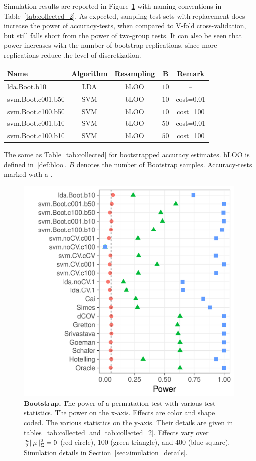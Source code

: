 \documentclass[]{bio}
\begin{document}
Simulation results are reported in Figure~\ref{fig:bootstrap} with naming conventions in Table~\ref{tab:collected_2}.
As expected, sampling test sets with replacement does increase the power of accuracy-tests, when compared to V-fold cross-validation, but still falls short from the power of two-group tests. 
It can also be seen that power increases with the number of bootstrap replications, since more replications reduce the level of discretization.

\bigskip

\begin{tcolorbox}
	\centering
	\footnotesize
	\begin{tabular}{l|c|c|c|c}
		Name & Algorithm & Resampling & B  & Remark\\ 
		\hline
		\hline
		\cue lda.Boot.b10 & LDA & bLOO 	& $10$ &  -- \\ 
		\cue svm.Boot.c001.b50 & SVM & bLOO 	& $10$ & cost=0.01 \\ 
		\cue svm.Boot.c100.b50 & SVM & bLOO 	& $10$ & cost=100 \\ 
		\cue svm.Boot.c001.b10 & SVM & bLOO 	& $50$ & cost=0.01 \\ 
		\cue svm.Boot.c100.b10 & SVM & bLOO 	& $50$ & cost=100 \\ 
	\end{tabular} 
	\captionsetup{type=table}
	\caption{\footnotesize
		The same as Table~\ref{tab:collected} for bootstrapped accuracy estimates. 
		bLOO is defined in~\ref{def:bloo}.
		$B$ denotes the number of Bootstrap samples.
		Accuracy-tests marked with a \cue.} 
	\label{tab:collected_2}
\end{tcolorbox}


\begin{figure}[ht]
	\centering
	\includegraphics[width=0.5\columnwidth]{"art/file13"}
	\caption{
		\textbf{Bootstrap.}
		The power of a permutation test with various test statistics. 
		The power on the x-axis. 
		Effects are color and shape coded. 
		The various statistics on the y-axis. 
		Their details are given in tables~\ref{tab:collected} and \ref{tab:collected_2}. 
		Effects vary over $\frac{n}{2}\Vert \mu \Vert^2_\Sigma=0$ (red circle), $100$ (green triangle), and $400$ (blue square). 
		Simulation details in Section~\ref{sec:simulation_details}.
	} 
	\label{fig:bootstrap}
\end{figure}
\end{document}
